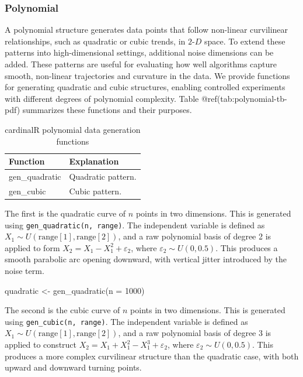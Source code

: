 \documentclass[
  11pt,
  a4paper,
]{report}
\newenvironment{Shaded}{\begin{snugshade}}{\end{snugshade}}
\newcommand{\AttributeTok}[1]{\textcolor[rgb]{0.40,0.45,0.13}{#1}}
\newcommand{\DecValTok}[1]{\textcolor[rgb]{0.68,0.00,0.00}{#1}}
\newcommand{\FunctionTok}[1]{\textcolor[rgb]{0.28,0.35,0.67}{#1}}
\newcommand{\NormalTok}[1]{\textcolor[rgb]{0.00,0.23,0.31}{#1}}
\newcommand{\OtherTok}[1]{\textcolor[rgb]{0.00,0.23,0.31}{#1}}
\newcommand\gD{$2\text{-}D$}
\begin{document}
\subsubsection{Polynomial}\label{polynomial}

A polynomial structure generates data points that follow non-linear
curvilinear relationships, such as quadratic or cubic trends, in \gD{}
space. To extend these patterns into high-dimensional settings,
additional noise dimensions can be added. These patterns are useful for
evaluating how well algorithms capture smooth, non-linear trajectories
and curvature in the data. We provide functions for generating quadratic
and cubic structures, enabling controlled experiments with different
degrees of polynomial complexity. Table @ref(tab:polynomial-tb-pdf)
summarizes these functions and their purposes.

\begin{table}

\caption{\label{tab:polynomial-tb-pdf}cardinalR polynomial data generation functions}
\centering
\begin{tabular}[t]{>{\raggedright\arraybackslash}p{4cm}>{\raggedright\arraybackslash}p{8cm}}
\toprule
Function & Explanation\\
\midrule
gen\_quadratic & Quadratic pattern.\\
gen\_cubic & Cubic pattern.\\
\bottomrule
\end{tabular}
\end{table}

The first is the quadratic curve of \(n\) points in two dimensions. This
is generated using \texttt{gen\_quadratic(n,\ range)}. The independent
variable is defined as \(X_1 \sim U(\text{range}[1], \text{range}[2])\),
and a raw polynomial basis of degree 2 is applied to form
\(X_2 = X_1 - X_1^2 + \varepsilon_2\), where
\(\varepsilon_2 \sim U(0, 0.5)\). This produces a smooth parabolic arc
opening downward, with vertical jitter introduced by the noise term.

\begin{Shaded}
\begin{Highlighting}[]
\NormalTok{quadratic }\OtherTok{\textless{}{-}} \FunctionTok{gen\_quadratic}\NormalTok{(}\AttributeTok{n =} \DecValTok{1000}\NormalTok{)}
\end{Highlighting}
\end{Shaded}

The second is the cubic curve of \(n\) points in two dimensions. This is
generated using \texttt{gen\_cubic(n,\ range)}. The independent variable
is defined as \(X_1 \sim U(\text{range}[1], \text{range}[2])\), and a
raw polynomial basis of degree \(3\) is applied to construct
\(X_2 = X_1 + X_1^2 - X_1^3 + \varepsilon_2\), where
\(\varepsilon_2 \sim U(0, 0.5)\). This produces a more complex
curvilinear structure than the quadratic case, with both upward and
downward turning points.
\end{document}
